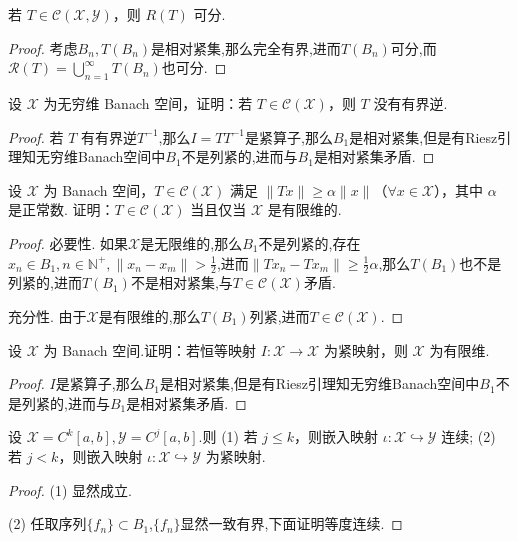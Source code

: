\documentclass[lang=cn,newtx,10pt,scheme=chinese,thmcnt=chapter]{elegantbook}
\begin{document}
\begin{problemset}
  \item 若 \(T \in  \mathcal{C}\left( {\mathcal{X},\mathcal{Y}}\right)\)，则 \(R\left( T\right)\) 可分.
\begin{proof}
    考虑$B_n,T(B_n)$是相对紧集,那么完全有界,进而$T(B_n)$可分,而$\mathcal{R}(T)=\bigcup\limits_{n=1}^\infty T(B_n)$也可分.
\end{proof}
  \item 设 \(\mathcal{X}\) 为无穷维 Banach 空间，证明：若 \(T \in  \mathcal{C}\left( \mathcal{X}\right)\)，则 \(T\) 没有有界逆.
\begin{proof}
    若 \(T\) 有有界逆$T^{-1}$,那么$I=TT^{-1}$是紧算子,那么$B_1$是相对紧集,但是有Riesz引理知无穷维Banach空间中$B_1$不是列紧的,进而与$B_1$是相对紧集矛盾.
\end{proof}
  \item 设 \(\mathcal{X}\) 为 Banach 空间，\(T \in  \mathcal{C}\left( \mathcal{X}\right)\) 满足 \(\|Tx\| \geq \alpha \|x\|\)（\(\forall x \in  \mathcal{X}\)），其中 \(\alpha\) 是正常数.  
  证明：\(T \in  \mathcal{C}\left( \mathcal{X}\right)\) 当且仅当 \(\mathcal{X}\) 是有限维的.
\begin{proof}
    必要性. 如果$\mathcal{X}$是无限维的,那么$B_1$不是列紧的,存在$x_n\in B_1,n\in \mathbb{N}^+,\|x_n-x_m\|>\frac{1}{2}$,进而$\|Tx_n-Tx_m\|\geq \frac{1}{2}\alpha$,那么$T(B_1)$也不是列紧的,进而$T(B_1)$不是相对紧集,与\(T \in  \mathcal{C}\left( \mathcal{X}\right)\)矛盾.

    充分性. 由于$\mathcal{X}$是有限维的,那么$T(B_1)$列紧,进而\(T \in  \mathcal{C}\left( \mathcal{X}\right)\).
\end{proof}
  \item 设 \(\mathcal{X}\) 为 Banach 空间.证明：若恒等映射 \(I : \mathcal{X} \rightarrow  \mathcal{X}\) 为紧映射，则 \(\mathcal{X}\) 为有限维.
\begin{proof}
    $I$是紧算子,那么$B_1$是相对紧集,但是有Riesz引理知无穷维Banach空间中$B_1$不是列紧的,进而与$B_1$是相对紧集矛盾.
\end{proof}
  \item 设 \(\mathcal{X} = C^{k}\left[ a,b\right], \mathcal{Y} = C^{j}\left[ a,b\right]\).则  
  (1) 若 \(j \leqslant k\)，则嵌入映射 \(\iota : \mathcal{X} \hookrightarrow  \mathcal{Y}\) 连续;  
  (2) 若 \(j < k\)，则嵌入映射 \(\iota : \mathcal{X} \hookrightarrow  \mathcal{Y}\) 为紧映射.
\begin{proof}
    (1) 显然成立.

    (2) 任取序列$\{f_n\}\subset B_1$,$\{f_n\}$显然一致有界,下面证明等度连续.


\end{proof}
\end{problemset}
\end{document}
